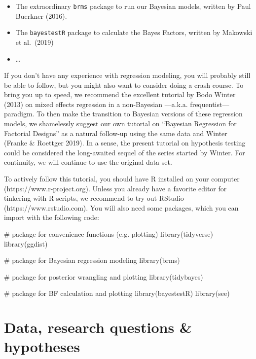 \documentclass[
  doc,
  longtable,
  nolmodern,
  notxfonts,
  notimes,
  colorlinks=true,linkcolor=blue,citecolor=blue,urlcolor=blue]{apa7}
\newenvironment{Shaded}{\begin{snugshade}}{\end{snugshade}}
\newcommand{\CommentTok}[1]{\textcolor[rgb]{0.37,0.37,0.37}{#1}}
\newcommand{\FunctionTok}[1]{\textcolor[rgb]{0.28,0.35,0.67}{#1}}
\newcommand{\NormalTok}[1]{\textcolor[rgb]{0.00,0.23,0.31}{#1}}
\begin{document}
\begin{itemize}
\item
  The extraordinary \texttt{brms} package to run our Bayesian models,
  written by Paul Buerkner (2016).
\item
  The \texttt{bayestestR} package to calculate the Bayes Factors,
  written by Makowski et al.~(2019)
\item
  \ldots{}
\end{itemize}

If you don't have any experience with regression modeling, you will
probably still be able to follow, but you might also want to consider
doing a crash course. To bring you up to speed, we recommend the
excellent tutorial by Bodo Winter (2013) on mixed eﬀects regression in a
non-Bayesian ---a.k.a. frequentist---paradigm. To then make the
transition to Bayesian versions of these regression models, we
shamelessly suggest our own tutorial on ``Bayesian Regression for
Factorial Designs'' as a natural follow-up using the same data and
Winter (Franke \& Roettger 2019). In a sense, the present tutorial on
hypothesis testing could be considered the long-awaited sequel of the
series started by Winter. For continuity, we will continue to use the
original data set.

To actively follow this tutorial, you should have R installed on your
computer (https://www.r-project.org). Unless you already have a favorite
editor for tinkering with R scripts, we recommend to try out RStudio
(https://www.rstudio.com). You will also need some packages, which you
can import with the following code:

\begin{Shaded}
\begin{Highlighting}[]
\CommentTok{\# package for convenience functions (e.g. plotting)}
\FunctionTok{library}\NormalTok{(tidyverse)}
\FunctionTok{library}\NormalTok{(ggdist)}

\CommentTok{\# package for Bayesian regression modeling}
\FunctionTok{library}\NormalTok{(brms)}

\CommentTok{\# package for posterior wrangling and plotting}
\FunctionTok{library}\NormalTok{(tidybayes)}

\CommentTok{\# package for BF calculation and plotting}
\FunctionTok{library}\NormalTok{(bayestestR)}
\FunctionTok{library}\NormalTok{(see)}
\end{Highlighting}
\end{Shaded}

\section{Data, research questions \&
hypotheses}\label{data-research-questions-hypotheses}
\end{document}
